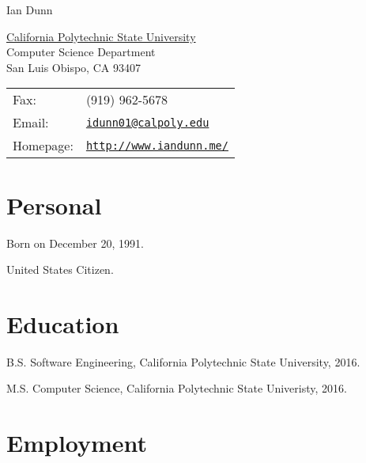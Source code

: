 \documentclass[letterpaper]{article}
\def\name{Ian Dunn}
\renewenvironment{itemize}{
  \begin{list}{}{
    \setlength{\leftmargin}{1.5em}
  }
}{
  \end{list}
}
\begin{document}
{\huge \name}


\vspace{0.25in}

\begin{minipage}{0.45\linewidth}
  \href{http://www.calpoly.edu/}{California Polytechnic State University} \\
  Computer Science Department \\
  San Luis Obispo, CA 93407
\end{minipage}
\begin{minipage}{0.45\linewidth}
  \begin{tabular}{ll}
    Fax: &  (919) 962-5678 \\
    Email: & \href{mailto:idunn01@calpoly.edu}{\tt idunn01@calpoly.edu} \\
    Homepage: & \href{http://www.iandunn.me/}{\tt http://www.iandunn.me/} \\
  \end{tabular}
\end{minipage}


\section*{Personal}

\begin{itemize}
\item Born on December 20, 1991.
\item United States Citizen.
\end{itemize}


\section*{Education}

\begin{itemize}
  \item B.S. Software Engineering, California Polytechnic State University, 2016.
  \item M.S. Computer Science, California Polytechnic State Univeristy, 2016.
\end{itemize}


\section*{Employment}
\end{document}
